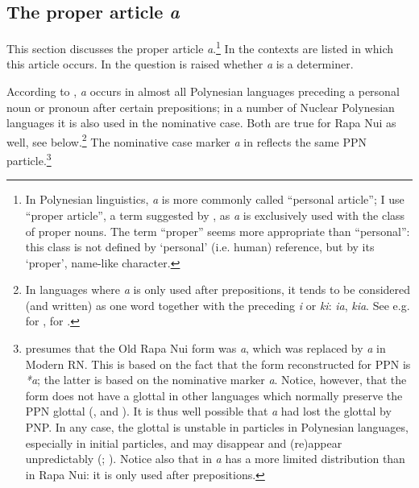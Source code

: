 \subsection{The proper article \textit{a}}\label{sec:5.13.2}
This section discusses the proper article \textit{a}.\footnote{\label{fn:278}In Polynesian linguistics, \textit{a} is more commonly called “personal article”; I use “proper article”, a term suggested by \citet[108]{Dixon2010-1}, as \textit{a} is exclusively used with the class of proper nouns. The term “proper” seems more appropriate than “personal”: this class is not defined by ‘personal’ (i.e. human) reference, but by its ‘proper’, name-like character.} In  the contexts are listed in which this article occurs. In  the question is raised whether \textit{a} is a determiner.

According to \citet[58]{Clark1976}, \textit{a} occurs in almost all Polynesian languages preceding a personal noun or pronoun after certain prepositions; in a number of Nuclear Polynesian languages it is also used in the nominative case. Both are true for Rapa Nui as well, see below.\footnote{\label{fn:279}In languages where \textit{a} is only used after prepositions, it tends to be considered (and written) as one word together with the preceding \textit{i} or \textit{ki}: \textit{ia}, \textit{kia}. See e.g. \citet[107]{ElbertPukui1979} for , \citet[186]{LazardPeltzer2000} for .} The nominative case marker \textit{{\ꞌ}a} in  reflects the same PPN particle.\footnote{\label{fn:280}\citet[429]{Fischer1994} presumes that the Old Rapa Nui form was \textit{{\ꞌ}a}, which was replaced by  \textit{a} in Modern RN. This is based on the fact that the form reconstructed for PPN is \textit{*{\ꞌ}a}; the latter is based on the  nominative marker \textit{{\ꞌ}a}. Notice, however, that the form does not have a glottal in other languages which normally preserve the PPN glottal (,  and ). It is thus well possible that \textit{a} had lost the glottal by PNP. In any case, the glottal is unstable in particles in Polynesian languages, especially in initial particles, and may disappear and (re)appear unpredictably (; \citealt[20]{Clark1976}). Notice also that in  \textit{a} has a more limited distribution than in Rapa Nui: it is only used after prepositions.} 

